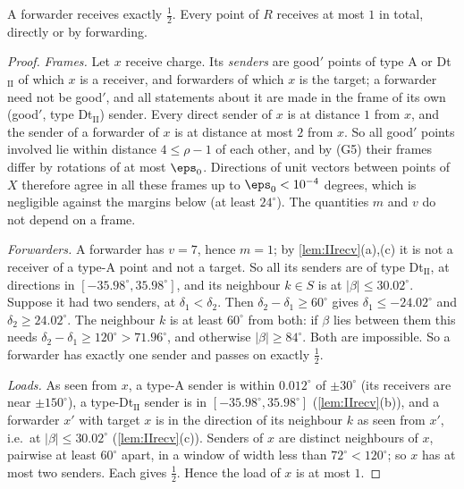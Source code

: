 \begin{lemma}[loads]\label{lem:IIloads}
A forwarder receives exactly $\frac12$. Every point of $R$ receives at most $1$ in total, directly or by forwarding.
\end{lemma}
\begin{proof}
\emph{Frames.} Let $x$ receive charge. Its \emph{senders} are good$'$ points of type A or Dt$_{\mathrm{II}}$ of which $x$ is a receiver, and forwarders of which $x$ is the target; a forwarder need not be good$'$, and all statements about it are made in the frame of its own (good$'$, type Dt$_{\mathrm{II}}$) sender. Every direct sender of $x$ is at distance $1$ from $x$, and the sender of a forwarder of $x$ is at distance at most $2$ from $x$. So all good$'$ points involved lie within distance $4\le\rho-1$ of each other, and by (G5) their frames differ by rotations of at most $\eps_0$. Directions of unit vectors between points of $X$ therefore agree in all these frames up to $\eps_0<10^{-4}$ degrees, which is negligible against the margins below (at least $24^\circ$). The quantities $m$ and $v$ do not depend on a frame.

\emph{Forwarders.} A forwarder has $v=7$, hence $m=1$; by \cref{lem:IIrecv}(a),(c) it is not a receiver of a type-A point and not a target. So all its senders are of type Dt$_{\mathrm{II}}$, at directions in $[-35.98^\circ,35.98^\circ]$, and its neighbour $k\in S$ is at $|\beta|\le30.02^\circ$. Suppose it had two senders, at $\delta_1<\delta_2$. Then $\delta_2-\delta_1\ge60^\circ$ gives $\delta_1\le-24.02^\circ$ and $\delta_2\ge24.02^\circ$. The neighbour $k$ is at least $60^\circ$ from both: if $\beta$ lies between them this needs $\delta_2-\delta_1\ge120^\circ>71.96^\circ$, and otherwise $|\beta|\ge84^\circ$. Both are impossible. So a forwarder has exactly one sender and passes on exactly $\frac12$.

\emph{Loads.} As seen from $x$, a type-A sender is within $0.012^\circ$ of $\pm30^\circ$ (its receivers are near $\pm150^\circ$), a type-Dt$_{\mathrm{II}}$ sender is in $[-35.98^\circ,35.98^\circ]$ (\cref{lem:IIrecv}(b)), and a forwarder $x'$ with target $x$ is in the direction of its neighbour $k$ as seen from $x'$, i.e.\ at $|\beta|\le30.02^\circ$ (\cref{lem:IIrecv}(c)). Senders of $x$ are distinct neighbours of $x$, pairwise at least $60^\circ$ apart, in a window of width less than $72^\circ<120^\circ$; so $x$ has at most two senders. Each gives $\frac12$. Hence the load of $x$ is at most $1$.
\end{proof}


